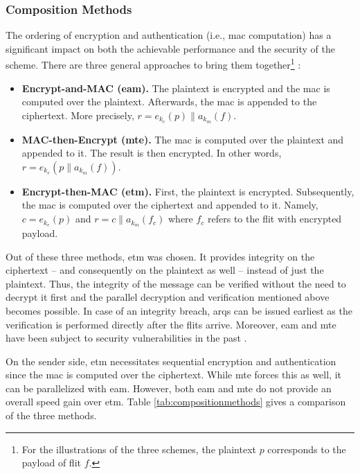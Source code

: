 \subsubsection{Composition Methods}
The ordering of encryption and authentication (i.e., \gls{mac} computation) has a significant impact on both the achievable performance and the
security of the scheme. There are three general approaches to bring them together\footnote{For the illustrations of the three schemes, the plaintext
$p$ corresponds to the payload of flit $f$.} \cite{bellare00authenc}:
\begin{itemize}
    \item \textbf{Encrypt-and-MAC (\gls{eam}).} The plaintext is encrypted and the \gls{mac} is computed over the plaintext. Afterwards, the \gls{mac} is
        appended to the ciphertext. More precisely, $r = e_{k_e}(p)\|a_{k_m}(f)$.
    \item \textbf{MAC-then-Encrypt (\gls{mte}).} The \gls{mac} is computed over the plaintext and appended to it. The result is then
        encrypted. In other words, $r = e_{k_e}(p\|a_{k_m}(f))$.
    \item \textbf{Encrypt-then-MAC (\gls{etm}).} First, the plaintext is encrypted. Subsequently, the \gls{mac} is computed over the ciphertext and appended to it.
        Namely, $c = e_{k_e}(p)$ and $r = c\|a_{k_m}(f_c)$ where $f_c$ refers to the flit with encrypted payload.
\end{itemize}
\vspace{0.5\baselineskip}

Out of these three methods, \gls{etm} was chosen. It provides integrity on the ciphertext -- and consequently on the plaintext as well --
instead of just the plaintext. Thus, the integrity of the message can be verified without the need to decrypt it first and the parallel decryption and
verification mentioned above becomes possible. In case of an integrity breach, \glspl{arq} can be issued earliest as the verification is
performed directly after the flits arrive. Moreover, \gls{eam} and \gls{mte} have been subject to security vulnerabilities in the past
\cites{bellare00authenc}{bellare04ssheam}{etmtls}.

On the sender side, \gls{etm} necessitates sequential encryption and authentication since the \gls{mac} is computed over the ciphertext. While
\gls{mte} forces this as well, it can be parallelized with \gls{eam}. However, both \gls{eam} and \gls{mte} do not provide an overall speed gain over
\gls{etm}. Table \ref{tab:compositionmethods} gives a comparison of the three methods.

